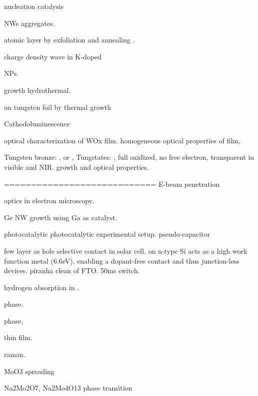 nucleation catalysis \cite{Turnbull1952}

 NWs aggregates. \cite{Kozan2008a}

 atomic layer by exfoliation and annealing . \cite{Kalantar-zadeh2010a}



charge density wave in K-doped  \cite{Raj2008}

 NPs. \cite{Frey2001}

 growth hydrothermal.\cite{Moshofsky2012}

 on tungsten foil by thermal growth\cite{VanHieu2012}

Cathodoluminescence \cite{Parish2007}

optical characterization of WOx film.\cite{Valyukh2010a}
homogeneous optical properties of  film,\cite{Valyukh2010a} 

Tungsten bronze: , or , 
Tungstates: , full oxidized, no free electron, transparent in visible and NIR. 
 growth and optical properties. \cite{Oishi2001} \cite{Itoh2001}

============================
E-beam penetration \cite{Kanaya2002}

optics in electron microscopy. \cite{GarciadeAbajo2010a}

Ge NW growth using Ga as catalyst. \cite{Chandrasekaran2006}

 photocatalytic \cite{Chithambararaj2013}
photocatalytic experimental setup.\cite{Hupka2006}
 pseudo-capacitor  \cite{Brezesinski2010}

 few layer as hole selective contact in solar cell.\cite{Battaglia2014}
 on n-type Si acts as a high work function metal (6.6eV), enabling a dopant-free contact and thus junction-less devices.
piranha clean of FTO. 50ms switch.\cite{Scherer2012} 

hydrogen absorption in .\cite{Sha2009}

 phase. \cite{Bramnik2004}

 phase, \cite{Gatehouse1983}

 thin film. \cite{Carcia1987}

 raman.\cite{Hirata1996}

MoO3 spreading \cite{Leyrer1990}

Na2Mo2O7, Na2Mo4O13 phase transition \cite{SinghMudher2005}\cite{Tangri1992}


